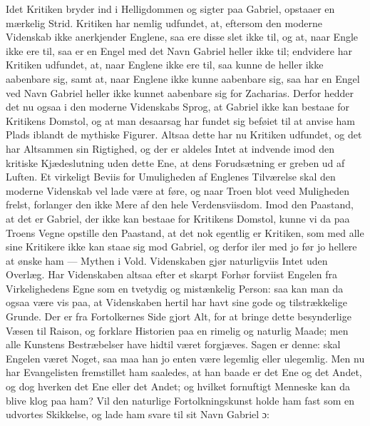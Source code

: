 \documentclass[12pt,a4paper]{book}
\begin{document}
Idet Kritiken bryder ind i Helligdommen og sigter paa Gabriel,
opstaaer en mærkelig Strid. Kritiken har nemlig udfundet, at,
eftersom den moderne Videnskab ikke anerkjender Englene, saa
ere disse slet ikke til, og at, naar Engle ikke ere til, saa er en Engel
med det Navn Gabriel heller ikke til; endvidere har Kritiken udfundet,
at, naar Englene ikke ere til, saa kunne de heller ikke aabenbare sig,
samt at, naar Englene ikke kunne aabenbare sig, saa har en Engel ved
Navn Gabriel heller ikke kunnet aabenbare sig for Zacharias. Derfor
hedder det nu ogsaa i den moderne Videnskabs Sprog, at Gabriel ikke
kan bestaae for Kritikens Domstol, og at man desaarsag har fundet sig
beføiet til at anvise ham Plads iblandt de mythiske Figurer. Altsaa
dette har nu Kritiken udfundet, og det har Altsammen sin Rigtighed, og
der er aldeles Intet at indvende imod den kritiske Kjædeslutning uden
dette Ene, at dens Forudsætning er greben ud af Luften. Et virkeligt
Beviis for Umuligheden af Englenes Tilværelse skal den moderne
Videnskab vel lade være at føre, og naar Troen blot veed Muligheden
frelst, forlanger den ikke Mere af den hele Verdensviisdom. Imod den
Paastand, at det er Gabriel, der ikke kan bestaae for Kritikens
Domstol, kunne vi da paa Troens Vegne opstille den Paastand, at det nok
egentlig er Kritiken, som med alle sine Kritikere ikke kan staae sig
mod Gabriel, og derfor iler med jo før jo hellere at ønske ham ---
Mythen i Vold. Videnskaben gjør naturligviis Intet uden Overlæg. Har
Videnskaben altsaa efter et skarpt Forhør forviist Engelen fra
Virkelighedens Egne som en tvetydig og mistænkelig Person: saa kan man
da ogsaa være vis paa, at Videnskaben hertil har havt sine gode og
tilstrækkelige Grunde. Der er fra Fortolkernes Side gjort Alt, for at
bringe dette besynderlige Væsen til Raison, og forklare Historien paa en
rimelig og naturlig Maade; men alle Kunstens Bestræbelser have hidtil
været forgjæves. Sagen er denne: skal Engelen været Noget, saa maa han
jo enten være legemlig eller ulegemlig. Men nu har Evangelisten
fremstillet ham saaledes, at han baade er det Ene og det Andet, og dog
hverken det Ene eller det Andet; og hvilket fornuftigt Menneske kan da
blive klog paa ham? Vil den naturlige Fortolkningskunst holde ham fast
som en udvortes Skikkelse, og lade ham svare til sit Navn Gabriel ɔ:
\end{document}
